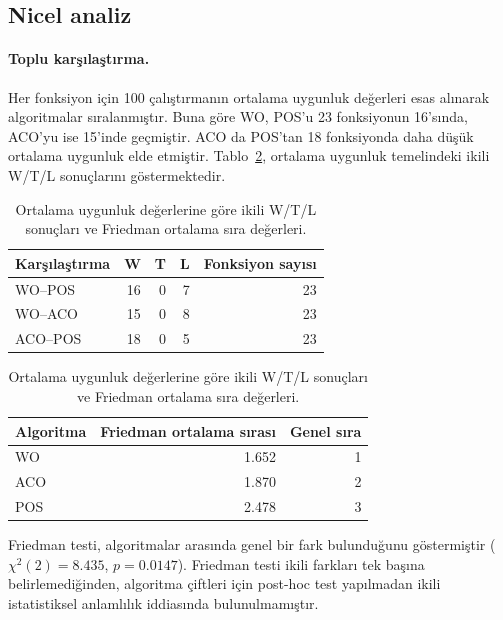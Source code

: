 \subsection{Nicel analiz}

\paragraph{Toplu karşılaştırma.}
Her fonksiyon için 100 çalıştırmanın ortalama uygunluk değerleri esas alınarak
algoritmalar sıralanmıştır. Buna göre WO, POS'u 23 fonksiyonun 16'sında, ACO'yu
ise 15'inde geçmiştir. ACO da POS'tan 18 fonksiyonda daha düşük ortalama
uygunluk elde etmiştir. Tablo~\ref{tab:overall-rank-results}, ortalama uygunluk
temelindeki ikili W/T/L sonuçlarını göstermektedir.

\begin{table}[htbp]
\centering
\small
\caption{Ortalama uygunluk değerlerine göre ikili W/T/L sonuçları ve Friedman ortalama sıra değerleri.}
\label{tab:overall-rank-results}
\begin{tabular}{@{}lrrrr@{}}
\hline
\textbf{Karşılaştırma} & \textbf{W} & \textbf{T} & \textbf{L} & \textbf{Fonksiyon sayısı} \\
\hline
WO--POS & 16 & 0 & 7 & 23 \\
WO--ACO & 15 & 0 & 8 & 23 \\
ACO--POS & 18 & 0 & 5 & 23 \\
\hline
\end{tabular}
\vspace{0.8em}
\begin{tabular}{@{}lrr@{}}
\hline
\textbf{Algoritma} & \textbf{Friedman ortalama sırası} & \textbf{Genel sıra} \\
\hline
WO & 1.652 & 1 \\
ACO & 1.870 & 2 \\
POS & 2.478 & 3 \\
\hline
\end{tabular}
\end{table}
Friedman testi, algoritmalar arasında genel bir fark bulunduğunu göstermiştir ($\chi^2(2)=8.435$, $p=0.0147$). Friedman testi ikili farkları tek başına belirlemediğinden, algoritma çiftleri için post-hoc test yapılmadan ikili istatistiksel anlamlılık iddiasında bulunulmamıştır.


